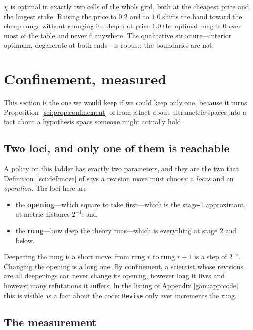 $\chi$ is optimal in exactly two cells of the whole grid, both at the cheapest
price and the largest stake. Raising the price to $0.2$ and to $1.0$ shifts the
band toward the cheap rungs without changing its shape: at price $1.0$ the
optimal rung is $0$ over most of the table and never $6$ anywhere. The
qualitative structure---interior optimum, degenerate at both ends---is robust;
the boundaries are not.

\section{Confinement, measured}\label{gam:sec:confine}\label{gam:S9}

This section is the one we would keep if we could keep only one, because it
turns Proposition~\ref{sci:prop:confinement} of \chSci from a fact about ultrametric spaces
into a fact about a hypothesis space someone might actually hold.

\subsection{Two loci, and only one of them is reachable}\label{gam:S9.1}

A policy on this ladder has exactly two parameters, and they are the two that
Definition~\ref{sci:def:move} of \chSci says a revision move must choose: a
\emph{locus} and an \emph{operation}. The loci here are

\begin{itemize}
\item the \textbf{opening}---which square to take first---which is the stage-1
approximant, at metric distance $2^{-1}$; and
\item the \textbf{rung}---how deep the theory runs---which is everything at
stage 2 and below.
\end{itemize}

Deepening the rung is a short move: from rung $r$ to rung $r+1$ is a step of
$2^{-r}$. Changing the opening is a long one. By confinement, a scientist whose
revisions are all deepenings can never change its opening, however long it lives
and however many refutations it suffers. In the listing of Appendix
\ref{gam:app:code} this is visible as a fact about the code: \texttt{Revise} only
ever increments the rung.

\subsection{The measurement}\label{gam:S9.2}

